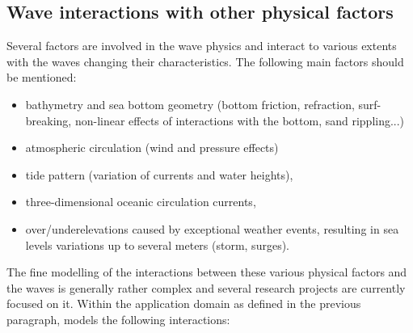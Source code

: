 \subsection{Wave interactions with other physical factors}
Several factors are involved in the wave physics and interact to various extents with the waves changing their characteristics. The following main factors should be mentioned:
\begin{itemize}
\item bathymetry and sea bottom geometry (bottom friction, refraction, surf-breaking, non-linear effects of interactions with the bottom, sand rippling...)
\item atmospheric circulation (wind and pressure effects)
\item tide pattern (variation of currents and water heights),
\item three-dimensional oceanic circulation currents,
\item over/underelevations caused by exceptional weather events, resulting in sea levels variations up to several meters (storm, surges).
\end{itemize}
The fine modelling of the interactions between these various physical factors and the waves is generally rather complex and several research projects are currently focused on it. Within the application domain as defined in the previous paragraph, \tomawac models the following interactions:
